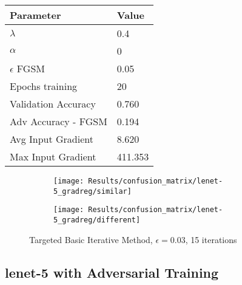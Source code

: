 \documentclass[draft,final]{vutinfth} %
\begin{document}
\begin{table}[h]
  \centering
  \begin{tabular}{ll}
    \toprule
			Parameter			& Value   					\\
    \midrule
			$\lambda$								& 0.4			\\
			$\alpha$								& 0				\\
			$\epsilon$ FGSM					& 0.05		\\
			Epochs training					& 20			\\
			
			Validation Accuracy			& 0.760		\\ 
			Adv Accuracy - FGSM			& 0.194		\\
			
			Avg Input Gradient			& 8.620		\\
			Max Input Gradient			& 411.353	\\
    \bottomrule
  \end{tabular}
\end{table}


\begin{figure}[h]
  \begin{subfigure}[b]{0.5\columnwidth}
		\centering
    \texttt{[image: Results/confusion\_matrix/lenet-5\_gradreg/similar]}
    \label{fig:exp:cm:lenet-5_gradreg:similar}
  \end{subfigure}
  \begin{subfigure}[b]{0.5\columnwidth}
		\centering
    \texttt{[image: Results/confusion\_matrix/lenet-5\_gradreg/different]}
    \label{fig:exp:cm:lenet-5_gradreg:different}
  \end{subfigure}
  \caption{Targeted Basic Iterative Method, $\epsilon = 0.03$, 15 iterations}
  \label{fig:exp:cm:lenet-5_gradreg}
\end{figure}
\clearpage

\subsection{lenet-5 with Adversarial Training}
\end{document}

